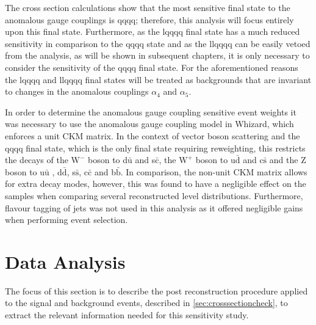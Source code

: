 The cross section calculations show that the most sensitive final state to the anomalous gauge couplings is \nu{\nu}qqqq; therefore, this analysis will focus entirely upon this final state.  Furthermore, as the l{\nu}qqqq final state has a much reduced sensitivity in comparison to the \nu{\nu}qqqq state and as the llqqqq can be easily vetoed from the analysis, as will be shown in subsequent chapters, it is only necessary to consider the sensitivity of the \nu{\nu}qqqq final state.  For the aforementioned reasons the l{\nu}qqqq and llqqqq final states will be treated as backgrounds that are invariant to changes in the anomalous couplings $\alpha_{4}$ and $\alpha_{5}$.  

In order to determine the anomalous gauge coupling sensitive event weights it was necessary to use the anomalous gauge coupling model in Whizard, which enforces a unit CKM matrix.  In the context of vector boson scattering and the \nu{\nu}qqqq final state, which is the only final state requiring reweighting, this restricts the decays of the $\text{W}^{-}$ boson to d$\bar{\text{u}}$ and s$\bar{\text{c}}$, the $\text{W}^{+}$ boson to u$\bar{\text{d}}$ and c$\bar{\text{s}}$ and the Z boson to u$\bar{\text{u}}$ , d$\bar{\text{d}}$, s$\bar{\text{s}}$, c$\bar{\text{c}}$ and b$\bar{\text{b}}$.  In comparison, the non-unit CKM matrix allows for extra decay modes, however, this was found to have a negligible effect on the samples when comparing several reconstructed level distributions.  Furthermore, flavour tagging of jets was not used in this analysis as it offered negligible gains when performing event selection.  


\section{Data Analysis}
\label{sec:dataanalysis}
The focus of this section is to describe the post reconstruction procedure applied to the signal and background events, described in \ref{sec:crosssectioncheck}, to extract the relevant information needed for this sensitivity study. 


